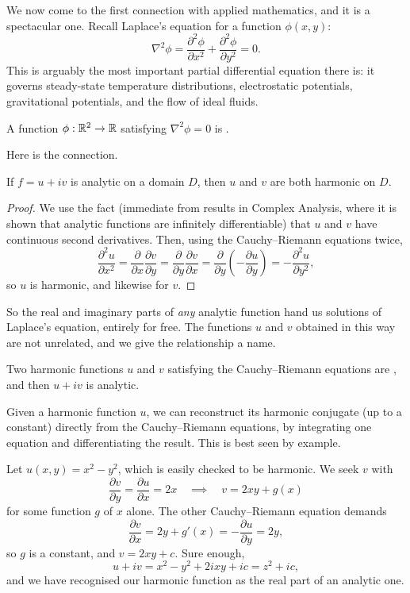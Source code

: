 \documentclass[a4paper]{scrartcl}
\begin{document}
We now come to the first connection with applied mathematics, and it is a spectacular one. Recall Laplace's equation for a function $\phi(x, y)$:
$$
\nabla^2 \phi = \frac{\partial^2 \phi}{\partial x^2} + \frac{\partial^2 \phi}{\partial y^2} = 0.
$$
This is arguably the most important partial differential equation there is: it governs steady-state temperature distributions, electrostatic potentials, gravitational potentials, and the flow of ideal fluids.

\begin{definition}
	A function $\phi : \mathbb{R}^2 \to \mathbb{R}$ satisfying $\nabla^2 \phi = 0$ is .
\end{definition}

Here is the connection.

\begin{proposition}
	If $f = u + iv$ is analytic on a domain $D$, then $u$ and $v$ are both harmonic on $D$.
\end{proposition}
\begin{proof}
	We use the fact (immediate from results in Complex Analysis, where it is shown that analytic functions are infinitely differentiable) that $u$ and $v$ have continuous second derivatives. Then, using the Cauchy--Riemann equations twice,
	$$
	\frac{\partial^2 u}{\partial x^2} = \frac{\partial}{\partial x}\frac{\partial v}{\partial y} = \frac{\partial}{\partial y} \frac{\partial v}{\partial x} = \frac{\partial}{\partial y}\left(-\frac{\partial u}{\partial y}\right) = -\frac{\partial^2 u}{\partial y^2},
	$$
	so $u$ is harmonic, and likewise for $v$.
\end{proof}

So the real and imaginary parts of \emph{any} analytic function hand us solutions of Laplace's equation, entirely for free. The functions $u$ and $v$ obtained in this way are not unrelated, and we give the relationship a name.

\begin{definition}
	Two harmonic functions $u$ and $v$ satisfying the Cauchy--Riemann equations are , and then $u + iv$ is analytic.
\end{definition}

Given a harmonic function $u$, we can reconstruct its harmonic conjugate (up to a constant) directly from the Cauchy--Riemann equations, by integrating one equation and differentiating the result. This is best seen by example.

\begin{example}
	Let $u(x, y) = x^2 - y^2$, which is easily checked to be harmonic. We seek $v$ with
	$$
	\frac{\partial v}{\partial y} = \frac{\partial u}{\partial x} = 2x
	\quad \implies \quad
	v = 2xy + g(x)
	$$
	for some function $g$ of $x$ alone. The other Cauchy--Riemann equation demands
	$$
	\frac{\partial v}{\partial x} = 2y + g'(x) = -\frac{\partial u}{\partial y} = 2y,
	$$
	so $g$ is a constant, and $v = 2xy + c$. Sure enough,
	$$
	u + iv = x^2 - y^2 + 2ixy + ic = z^2 + ic,
	$$
	and we have recognised our harmonic function as the real part of an analytic one.
\end{example}
\end{document}
